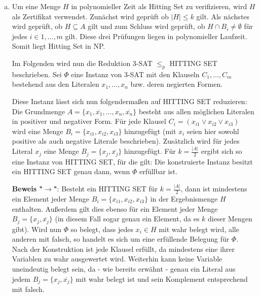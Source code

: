 \documentclass[12pt,a4paper]{article}
\begin{document}
\begin{enumerate}[a)]

	\item Um eine Menge $H$ in polynomieller Zeit als Hitting Set zu verifizieren, wird $H$ als Zertifikat verwendet.
	Zunächst wird geprüft ob $|H|\le k$ gilt. Als nächstes wird geprüft, ob $H \subseteq A$ gilt und zum Schluss wird geprüft, ob $H \cap B_i \neq \emptyset$ für jedes $i \in {1,\dots,m}$ gilt.
	Diese drei Prüfungen liegen in polynomieller Laufzeit. Somit liegt Hitting Set in NP.
	
	Im Folgenden wird nun die Reduktion 3-SAT \(\le_p\) HITTING SET beschrieben. Sei \(\Phi\) eine Instanz von 3-SAT mit den Klauseln \(C_1, \dots, C_m\) bestehend aus den Literalen \(x_1, \dots, x_n\) bzw. deren negierten Formen.
	
	Diese Instanz lässt sich nun folgendermaßen auf HITTING SET reduzieren: Die Grundmenge \(A = \{x_1, \overline{x_1}, \dots, x_n, \overline{x_n}\}\) besteht aus allen möglichen Literalen in positiver und negativer Form. Für jede Klausel \(C_i = (x_{i1} \lor x_{i2} \lor x_{i3})\) wird eine Menge \(B_i = \{x_{i1}, x_{i2}, x_{i3}\}\) hinzugefügt (mit \(x_{i}\) seien hier sowohl positive als auch negative Literale beschrieben). Zusätzlich wird für jedes Literal \(x_j\) eine Menge \(B_j = \{x_j, \overline{x_j}\}\) hinzugefügt. Für \(k = \frac{|A|}{2}\) ergibt sich so eine Instanz von HITTING SET, für die gilt: Die konstruierte Instanz besitzt ein HITTING SET genau dann, wenn \(\Phi\) erfüllbar ist.
	
	\textbf{Beweis "\(\rightarrow\)"}: Besteht ein HITTING SET für \(k = \frac{|A|}{2}\), dann ist mindestens ein Element jeder Menge \(B_i = \{x_{i1}, x_{i2}, x_{i3}\}\) in der Ergebnismenge \(H\) enthalten. Außerdem gilt dies ebenso für ein Element jeder Menge \(B_j = \{x_j, \overline{x_j}\}\) (in diesem Fall sogar genau ein Element, da es \(k\) dieser Mengen gibt). Wird nun \(\Phi\) so belegt, dass jedes \(x_i \in H\) mit wahr belegt wird, alle anderen mit falsch, so handelt es sich um eine erfüllende Belegung für \(\Phi\). Nach der Konstruktion ist jede Klausel erfüllt, da mindestens eine ihrer Variablen zu wahr ausgewertet wird. Weiterhin kann keine Variable uneindeutig belegt sein, da - wie bereits erwähnt - genau ein Literal aus jedem \(B_j = \{x_j, \overline{x_j}\}\) mit wahr belegt ist und sein Komplement entsprechend mit falsch.
	

\end{enumerate}
\end{document}
